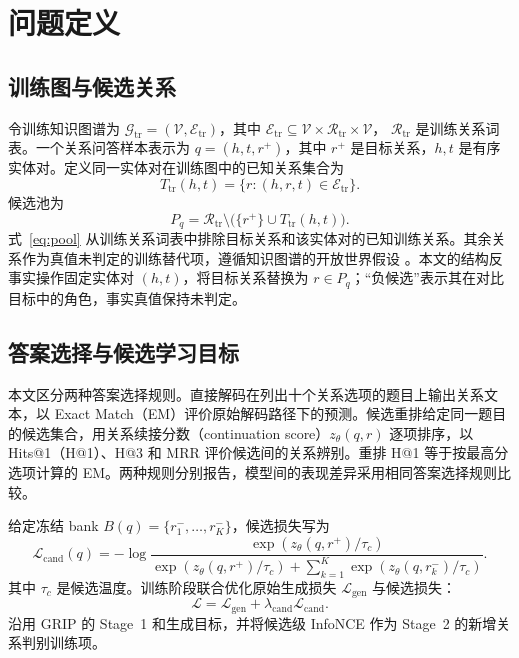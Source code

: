\section{问题定义}

\subsection{训练图与候选关系}

令训练知识图谱为 $\mathcal{G}_{\mathrm{tr}}=(\mathcal{V},\mathcal{E}_{\mathrm{tr}})$，其中
$\mathcal{E}_{\mathrm{tr}}\subseteq \mathcal{V}\times\mathcal{R}_{\mathrm{tr}}\times\mathcal{V}$，
$\mathcal{R}_{\mathrm{tr}}$ 是训练关系词表。一个关系问答样本表示为
$q=(h,t,r^+)$，其中 $r^+$ 是目标关系，$h,t$ 是有序实体对。定义同一实体对在训练图中的已知关系集合为
\begin{equation}
    T_{\mathrm{tr}}(h,t)=\{r:(h,r,t)\in\mathcal{E}_{\mathrm{tr}}\}.
\end{equation}
候选池为
\begin{equation}
    P_q=\mathcal{R}_{\mathrm{tr}}\setminus\bigl(\{r^+\}\cup T_{\mathrm{tr}}(h,t)\bigr).
    \label{eq:pool}
\end{equation}
式~\ref{eq:pool} 从训练关系词表中排除目标关系和该实体对的已知训练关系。其余关系作为真值未判定的训练替代项，遵循知识图谱的开放世界假设 \citep{ji2022survey,hogan2021kg}。本文的结构反事实操作固定实体对 $(h,t)$，将目标关系替换为 $r\in P_q$；“负候选”表示其在对比目标中的角色，事实真值保持未判定。

\subsection{答案选择与候选学习目标}

本文区分两种答案选择规则。直接解码在列出十个关系选项的题目上输出关系文本，以 Exact Match（EM）评价原始解码路径下的预测。候选重排给定同一题目的候选集合，用关系续接分数（continuation score）$z_\theta(q,r)$ 逐项排序，以 Hits@1（H@1）、H@3 和 MRR 评价候选间的关系辨别。重排 H@1 等于按最高分选项计算的 EM。两种规则分别报告，模型间的表现差异采用相同答案选择规则比较。

给定冻结 bank $B(q)=\{r_1^-,\ldots,r_K^-\}$，候选损失写为
\begin{equation}
    \mathcal{L}_{\mathrm{cand}}(q)=-\log
    \frac{\exp(z_\theta(q,r^+)/\tau_c)}
    {\exp(z_\theta(q,r^+)/\tau_c)+\sum_{k=1}^K\exp(z_\theta(q,r_k^-)/\tau_c)}.
    \label{eq:infonce}
\end{equation}
其中 $\tau_c$ 是候选温度。训练阶段联合优化原始生成损失 $\mathcal{L}_{\mathrm{gen}}$ 与候选损失：
\begin{equation}
    \mathcal{L}=\mathcal{L}_{\mathrm{gen}}+\lambda_{\mathrm{cand}}\mathcal{L}_{\mathrm{cand}}.
    \label{eq:total}
\end{equation}
\scc{} 沿用 GRIP 的 Stage~1 和生成目标，并将候选级 InfoNCE 作为 Stage~2 的新增关系判别训练项。
